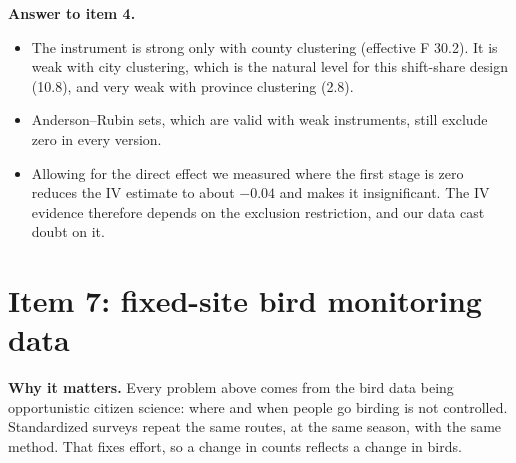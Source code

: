 \documentclass[11pt]{article}
\begin{document}
\begin{answerbox}
\textbf{Answer to item 4.}
\begin{itemize}[leftmargin=14pt,itemsep=1pt,topsep=2pt]
\item The instrument is strong only with county clustering (effective F 30.2). It is weak with city clustering, which is the natural level for this shift-share design (10.8), and very weak with province clustering (2.8).
\item Anderson--Rubin sets, which are valid with weak instruments, still exclude zero in every version.
\item Allowing for the direct effect we measured where the first stage is zero reduces the IV estimate to about $-0.04$ and makes it insignificant. The IV evidence therefore depends on the exclusion restriction, and our data cast doubt on it.
\end{itemize}
\end{answerbox}

\section{Item 7: fixed-site bird monitoring data}
\textbf{Why it matters.} Every problem above comes from the bird data being opportunistic citizen science: where and when people go birding is not controlled. Standardized surveys repeat the same routes, at the same season, with the same method. That fixes effort, so a change in counts reflects a change in birds.
\end{document}
